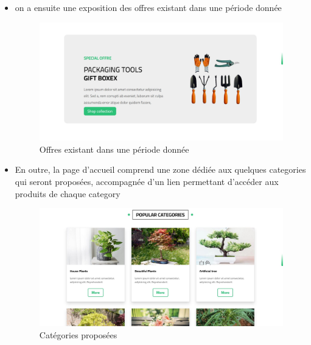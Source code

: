 \documentclass[a4paper,12pt,oneside]{article}
\begin{document}
{\begin{enumerate}
\begin{itemize}
		\item on a ensuite une exposition des offres existant dans une période donnée
  	
		\begin{figure}[h]
		\centering
  		\includegraphics[width=15cm]{offre}
  		\caption{Offres existant dans une période donnée}
		\end{figure}
		
		\item En outre, la page d’accueil comprend une zone dédiée aux quelques categories qui seront
proposées, accompagnée d’un lien permettant d’accéder aux produits de chaque category
  	
		\begin{figure}[h]
		\centering
  		\includegraphics[width=15cm]{categories}
  		\caption{Catégories proposées}
		\end{figure}
		
  	\end{itemize}
  	
  	
  	

\end{enumerate}}
\end{document}
